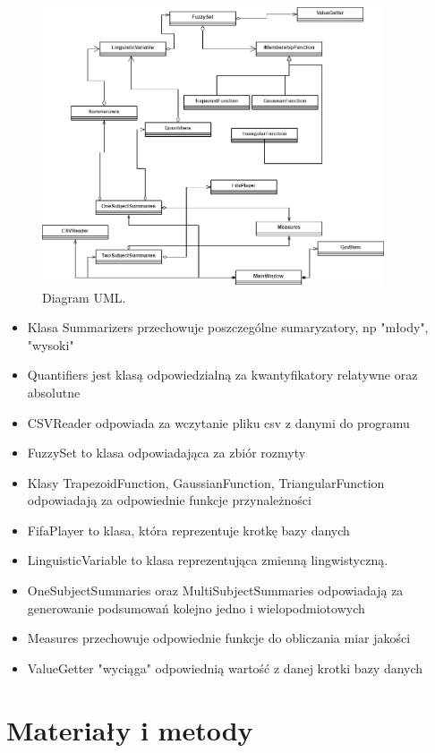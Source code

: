 \documentclass{classrep}
\begin{document}
	\begin{figure}[h!]
		\centering
		\includegraphics[width=0.9\textwidth]{../uml/uml.png}
		\caption{Diagram UML.}
		\label{uml}
	\end{figure}
	
	\begin{itemize}
		\item Klasa Summarizers przechowuje poszczególne sumaryzatory, np "młody", "wysoki" 
		\item Quantifiers jest klasą odpowiedzialną za kwantyfikatory relatywne oraz absolutne
		\item CSVReader odpowiada za wczytanie pliku csv z danymi do programu
		\item FuzzySet to klasa odpowiadająca za zbiór rozmyty
		\item Klasy TrapezoidFunction, GaussianFunction, TriangularFunction odpowiadają za odpowiednie funkcje przynależności
		\item FifaPlayer to klasa, która reprezentuje krotkę bazy danych
		\item LinguisticVariable to klasa reprezentująca zmienną lingwistyczną.
		\item OneSubjectSummaries oraz MultiSubjectSummaries odpowiadają za generowanie podsumowań kolejno jedno i wielopodmiotowych
		\item Measures przechowuje odpowiednie funkcje do obliczania miar jakości
		\item ValueGetter "wyciąga" odpowiednią wartość z danej krotki bazy danych
	\end{itemize}
	
	\section{Materiały i metody} %
\end{document}
